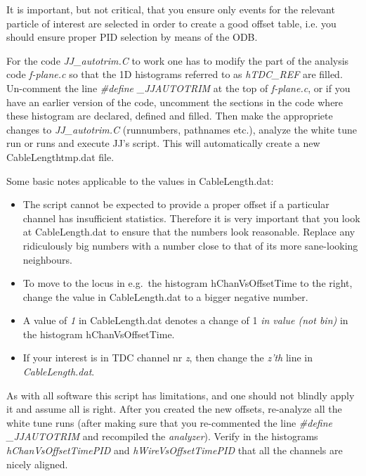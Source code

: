 \documentclass[11pt]{report}
\begin{document}
It is important, but not critical, that you ensure only events for the relevant particle of 
interest are selected in order to create a good offset table, i.e. you should ensure proper 
PID selection by means of the ODB.

For the code  {\it JJ\_autotrim.C} to work one has to modify the part of the analysis 
code {\it f-plane.c} so that the 1D histograms referred to as {\it hTDC\_REF} are filled. 
Un-comment the line {\it \#define \_JJAUTOTRIM} at the top of {\it f-plane.c}, or if
you have an earlier version of the code, uncomment the sections in the code 
where these histogram are declared, defined and filled.
Then make the appropriete changes to {\it JJ\_autotrim.C} (runnumbers, pathnames etc.), 
analyze the white tune run or runs
and execute JJ's script. This will automatically create a new CableLengthtmp.dat file.

Some basic notes applicable to the values in CableLength.dat:
\begin{itemize}
\item The script cannot be expected to provide a proper offset if a particular channel has insufficient statistics.
Therefore it is very important that you look at CableLength.dat to ensure that the numbers look reasonable.
Replace any ridiculously big numbers with a number close to that of its more sane-looking neighbours.
\item To move to the locus in e.g.~the histogram hChanVsOffsetTime to the right, change the value in 
CableLength.dat to a bigger negative number.
\item A value of {\it 1} in CableLength.dat denotes a change of 1 {\it in value (not bin)} in the histogram hChanVsOffsetTime.
\item If your interest is in TDC channel nr {\it z}, then change the {\it z'th} 
line in {\it CableLength.dat}.
\end{itemize}

As with all software this script has limitations, and one should not blindly apply it and assume
all is right. After you created the new offsets, re-analyze all the white tune runs (after making
sure that you re-commented the line {\it \#define \_JJAUTOTRIM} and recompiled the {\it analyzer}).
Verify in the histograms {\it hChanVsOffsetTimePID} 
and {\it hWireVsOffsetTimePID} that all the channels are nicely aligned.
\end{document}
